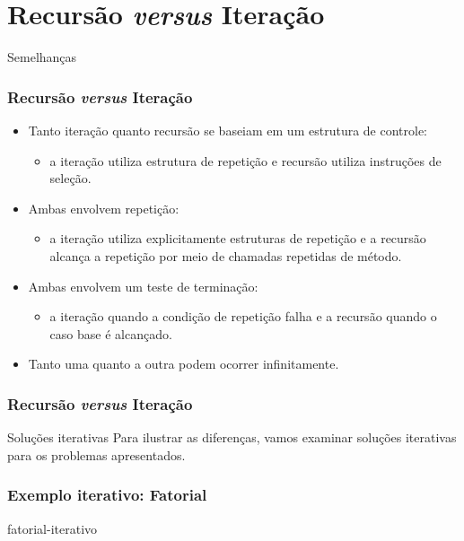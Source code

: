 \documentclass[aspectratio=169]{beamer}
\begin{document}
\section{Recursão {\it versus} Iteração} 
\begin{frame}

Semelhanças

\frametitle{Recursão {\it versus} Iteração}
  \begin{itemize}
    \item Tanto iteração quanto recursão se baseiam em um estrutura de controle: 
      \begin{itemize}
	\item a iteração utiliza estrutura de repetição e recursão utiliza instruções de seleção.
      \end{itemize}
    \item Ambas envolvem repetição:
      \begin{itemize}
	\item a iteração utiliza explicitamente estruturas de repetição e a recursão alcança a repetição por meio de chamadas repetidas de método.
      \end{itemize}    
    \item Ambas envolvem um teste de terminação:
      \begin{itemize}
	\item a iteração quando a condição de repetição falha e a recursão quando o caso base é alcançado.
      \end{itemize}       
    \item Tanto uma quanto a outra podem ocorrer infinitamente.
  \end{itemize}
\end{frame}


\begin{frame}
\frametitle{Recursão {\it versus} Iteração}
\begin{block}{Soluções iterativas}
 Para ilustrar as diferenças, vamos examinar soluções iterativas para os problemas apresentados.
\end{block}
\end{frame}


\begin{frame}
\frametitle{Exemplo iterativo: Fatorial}

\begin{algorithm}[H]
\caption{fatorial-iterativo} 
\label{fatorial-iterativo}
\end{algorithm}

\end{frame}
\end{document}
